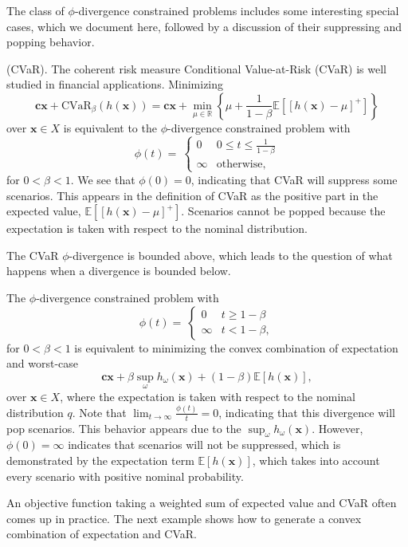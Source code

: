 \documentclass[ijoc,letterpaper]{informs3} %
\newcommand{\R}{{\mathbb{R}}}
\newcommand{\E}{\mathbb{E}}
\newcommand{\e}[1]{\E \left[ #1 \right]}
\newcommand{\x}{\mathbf{x}}
\renewcommand{\c}{\mathbf{c}}
\begin{document}
The class of $\phi$-divergence constrained problems includes some interesting special cases, which we document here, followed by a discussion of their suppressing and popping behavior.

\begin{example}{(CVaR).}
	The coherent risk measure Conditional Value-at-Risk (CVaR) is well studied in financial applications.
	Minimizing
	\[
		\c\x + \text{CVaR}_\beta(h(\x)) = \c\x + \min_{\mu \in \R} \left\{ \mu + \frac{1}{1-\beta}\e{\left[h(\x)-\mu\right]^+} \right\}
	\]
	over $\x \in X$ is equivalent to the $\phi$-divergence constrained problem with
	\[
		\phi(t) = \
		\begin{cases}
			0 & 0 \leq t \leq \frac{1}{1-\beta} \\
			\infty & \text{otherwise},
		\end{cases}
	\]
	for $0 < \beta < 1$.
	We see that $\phi(0) = 0$, indicating that CVaR will suppress some scenarios.
	This appears in the definition of CVaR as the positive part in the expected value, $\e{[h(\x)-\mu]^+}$.
	Scenarios cannot be popped because the expectation is taken with respect to the nominal distribution.
\end{example}

The CVaR $\phi$-divergence is bounded above, which leads to the question of what happens when a divergence is bounded below.
\begin{example}
	The $\phi$-divergence constrained problem with
	\[
		\phi(t) = \
		\begin{cases}
			0 & t \geq 1-\beta \\
			\infty & t < 1-\beta,
		\end{cases}
	\]
	for $0 < \beta < 1$ is equivalent to minimizing the convex combination of expectation and worst-case
	\[
		\c\x + \beta \sup_\omega h_\omega(\x) + (1-\beta)\e{h(\x)},
	\]
	over $\x \in X$, where the expectation is taken with respect to the nominal distribution $q$.
	Note that $\lim_{t \rightarrow \infty} \frac{\phi(t)}{t} = 0$, indicating that this divergence will pop scenarios.
	This behavior appears due to the $\sup_\omega h_\omega(\x)$.
	However, $\phi(0) = \infty$ indicates that scenarios will not be suppressed, which is demonstrated by the expectation term $\e{h(\x)}$, which takes into account every scenario with positive nominal probability.
\end{example}

An objective function taking a weighted sum of expected value and CVaR often comes up in practice.
The next example shows how to generate a convex combination of expectation and CVaR.
\end{document}
